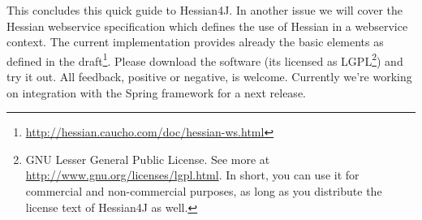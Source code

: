 \documentclass[a4paper]{article}
\begin{document}
This concludes this quick guide to Hessian4J. In another issue we will cover the Hessian webservice specification which defines the use of Hessian in a webservice context.  The current implementation provides already the basic elements as defined in the draft\footnote{\url{http://hessian.caucho.com/doc/hessian-ws.html}}. Please download the software (its licensed as LGPL\footnote{GNU Lesser General Public License. See more at \url{http://www.gnu.org/licenses/lgpl.html}. In short, you can use it for commercial and non-commercial purposes, as long as you distribute the license text of Hessian4J as well.}) and try it out. All feedback, positive or negative, is welcome.  Currently we're working on integration with the Spring framework for a next release.
\end{document}
